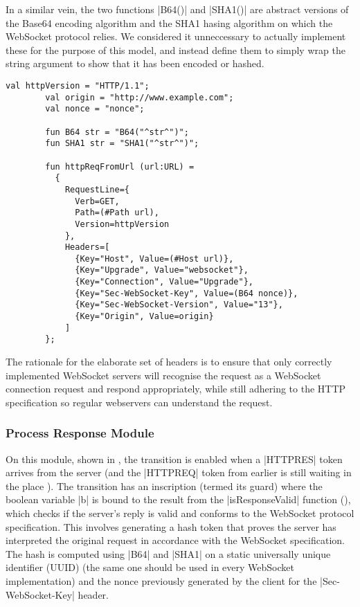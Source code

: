 		In a similar vein, the two functions |B64()| and |SHA1()| are
		abstract versions of the Base64 encoding algorithm \cite{rfc4648} and the SHA1
		hasing algorithm \cite{fips.180-2} on which the WebSocket protocol relies. We
		considered it unneccessary to actually implement these for the purpose of
		this model, and instead define them to simply wrap the string argument to show
		that it has been encoded or hashed.
		
		\begin{lstlisting}[label=lst:httpReqFromUrl,caption=httpReqFromUrl,gobble=2,float]
		val httpVersion = "HTTP/1.1";
		val origin = "http://www.example.com";
		val nonce = "nonce";
		
		fun B64 str = "B64("^str^")";
		fun SHA1 str = "SHA1("^str^")";
		
		fun httpReqFromUrl (url:URL) = 
          {
            RequestLine={
              Verb=GET, 
              Path=(#Path url),
              Version=httpVersion
            },
            Headers=[
              {Key="Host", Value=(#Host url)},
              {Key="Upgrade", Value="websocket"},
              {Key="Connection", Value="Upgrade"},
              {Key="Sec-WebSocket-Key", Value=(B64 nonce)},
              {Key="Sec-WebSocket-Version", Value="13"},
              {Key="Origin", Value=origin}
            ]
		};
		\end{lstlisting}
		
		The rationale for the elaborate set of headers is to ensure that only
		correctly implemented WebSocket servers will recognise the request as a
		WebSocket connection request and respond appropriately, while still adhering
		to the HTTP specification so regular webservers can understand the request.
		
		
	\subsubsection{Process Response Module}
		
		
		On this module, shown in , the transition
		 is enabled when a |HTTPRES| token arrives
		from the server (and the |HTTPREQ| token from earlier is still waiting in the
		place ). The transition has an
		inscription (termed its guard) where the boolean variable |b| is bound to the
		result from the |isResponseValid| function (), which checks if the
		server's reply is valid and conforms to the WebSocket protocol specification.
		This involves generating a hash token that proves the server has interpreted
		the original request in accordance with the WebSocket specification. The hash
		is computed using |B64| and |SHA1| on a static universally unique identifier
		(UUID) (the same one should be used in every WebSocket implementation) and the
		nonce previously generated by the client for the |Sec-WebSocket-Key| header.
		
